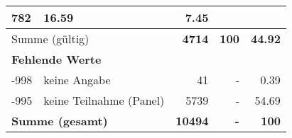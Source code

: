 \begin{longtable}{lXrrr}
       \num{782} &
       \num[round-mode=places,round-precision=2]{16.59} &
         \num[round-mode=places,round-precision=2]{7.45} \\
     \midrule
     \multicolumn{2}{l}{Summe (gültig)} &
       \textbf{\num{4714}} &
     \textbf{\num{100}} &
       \textbf{\num[round-mode=places,round-precision=2]{44.92}} \\
     \multicolumn{5}{l}{\textbf{Fehlende Werte}}\\
       -998 &
       keine Angabe &
         \num{41} &
        - &
         \num[round-mode=places,round-precision=2]{0.39} \\
       -995 &
       keine Teilnahme (Panel) &
         \num{5739} &
        - &
         \num[round-mode=places,round-precision=2]{54.69} \\
     \midrule
     \multicolumn{2}{l}{\textbf{Summe (gesamt)}} &
          \textbf{\num{10494}} &
        \textbf{-} &
        \textbf{\num{100}} \\
     \bottomrule
     \end{longtable}
     
